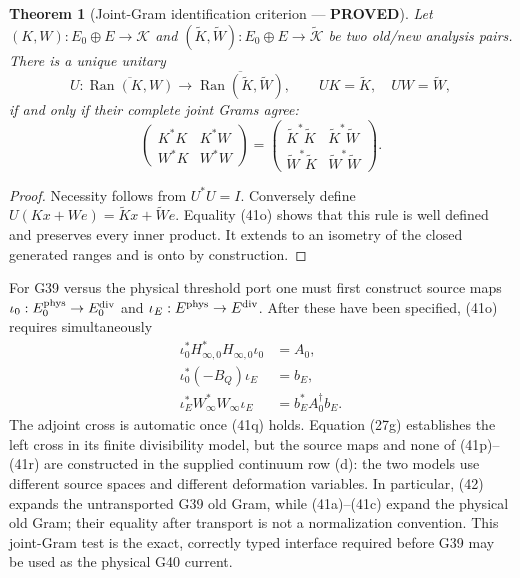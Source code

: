 \documentclass[11pt]{article}
\newtheorem{theorem}{Theorem}
\newcommand{\PROVED}{\textcolor{green!45!black}{\textbf{PROVED}}}
\newcommand{\Ran}{\operatorname{Ran}}
\begin{document}
\begin{theorem}[Joint-Gram identification criterion --- \PROVED]
Let $(K,W):E_0\oplus E\to\mathcal K$ and
$(\widetilde K,\widetilde W):E_0\oplus E\to\widetilde{\mathcal K}$ be two
old/new analysis pairs.  There is a unique unitary
\begin{equation}
 U:\overline{\Ran(K,W)}\longrightarrow
   \overline{\Ran(\widetilde K,\widetilde W)},
 \qquad UK=\widetilde K,\quad UW=\widetilde W,          \tag{41n}
\end{equation}
if and only if their complete joint Grams agree:
\begin{equation}
 \begin{pmatrix}K^*K&K^*W\\W^*K&W^*W\end{pmatrix}
 =
 \begin{pmatrix}
 \widetilde K^*\widetilde K&\widetilde K^*\widetilde W\\
 \widetilde W^*\widetilde K&\widetilde W^*\widetilde W
 \end{pmatrix}.                                       \tag{41o}
\end{equation}
\end{theorem}

\begin{proof}
Necessity follows from $U^*U=I$.  Conversely define
$U(Kx+We)=\widetilde Kx+\widetilde We$.  Equality (41o) shows that this rule
is well defined and preserves every inner product.  It extends to an
isometry of the closed generated ranges and is onto by construction.
\end{proof}

For G39 versus the physical threshold port one must first construct source
maps $\iota_0:E_0^{\rm phys}\to E_0^{\rm div}$ and
$\iota_E:E^{\rm phys}\to E^{\rm div}$.  After these have been specified,
(41o) requires simultaneously
\begin{align}
 \iota_0^*H_{\infty,0}^*H_{\infty,0}\iota_0&=A_0,   \tag{41p}\\
 \iota_0^*(-B_Q)\iota_E&=b_E,                         \tag{41q}\\
 \iota_E^*W_\infty^*W_\infty\iota_E
 &=b_E^*A_0^\dagger b_E.                               \tag{41r}
\end{align}
The adjoint cross is automatic once (41q) holds.  Equation (27g) establishes
the left cross in its finite divisibility model, but the source maps and none
of (41p)--(41r) are constructed in the supplied continuum row (d): the two
models use different source spaces and different deformation variables.  In
particular, (42) expands the untransported G39 old Gram, while (41a)--(41c)
expand the physical old Gram; their equality after transport is not a
normalization convention.  This joint-Gram test is
the exact, correctly typed interface required before G39 may be used as the
physical G40 current.
\end{document}

